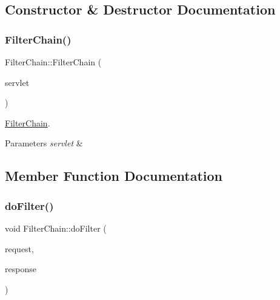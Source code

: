 \subsection{Constructor \& Destructor Documentation}
\mbox{\label{class_filter_chain_a2631e4de118e5ea95f1f84c55828b526}} 
\subsubsection{\texorpdfstring{Filter\+Chain()}{FilterChain()}}
{\footnotesize\ttfamily Filter\+Chain\+::\+Filter\+Chain (\begin{DoxyParamCaption}\item[{\mbox{\hyperlink{class_http_servlet}{Http\+Servlet}} $\ast$}]{servlet }\end{DoxyParamCaption})\hspace{0.3cm}{\ttfamily [explicit]}}



\mbox{\hyperlink{class_filter_chain}{Filter\+Chain}}. 


\begin{DoxyParams}{Parameters}
{\em servlet} & \\
\hline
\end{DoxyParams}


\subsection{Member Function Documentation}
\mbox{\label{class_filter_chain_a2792dc5418eeb0914af046d78f679d51}} 
\subsubsection{\texorpdfstring{do\+Filter()}{doFilter()}}
{\footnotesize\ttfamily void Filter\+Chain\+::do\+Filter (\begin{DoxyParamCaption}\item[{C\+W\+F\+::\+Http\+Servlet\+Request \&}]{request,  }\item[{C\+W\+F\+::\+Http\+Servlet\+Response \&}]{response }\end{DoxyParamCaption})}



